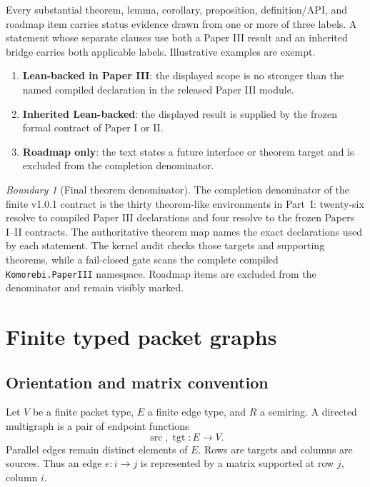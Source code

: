 \documentclass[11pt,a4paper]{article}
\theoremstyle{plain}
\theoremstyle{definition}
\theoremstyle{remark}
\newtheorem{boundary}[boundary]{Boundary}
\newcommand{\src}{\operatorname{src}}
\newcommand{\tgt}{\operatorname{tgt}}
\newcommand{\leanname}[1]{\nolinkurl{#1}}
\begin{document}
Every substantial theorem, lemma, corollary, proposition, definition/API, and
roadmap item carries status evidence drawn from one or more of three labels.
A statement
whose separate clauses use both a Paper III result and an inherited bridge
carries both applicable labels.  Illustrative examples are exempt.
\begin{enumerate}[label=\textbf{S\arabic*.},leftmargin=3.2em]
\item \textbf{Lean-backed in Paper III}: the displayed scope is no stronger
than the named compiled declaration in the released Paper III module.
\item \textbf{Inherited Lean-backed}: the displayed result is supplied by the
frozen formal contract of Paper I or II.
\item \textbf{Roadmap only}: the text states a future interface or theorem
target and is excluded from the completion denominator.
\end{enumerate}

\begin{boundary}[Final theorem denominator]
The completion denominator of the finite v1.0.1 contract is the thirty theorem-like environments in Part~I: twenty-six resolve to compiled Paper III declarations and four resolve
to the frozen Papers I--II contracts.  The authoritative theorem map names the
exact declarations used by each statement.  The kernel audit checks those
targets and supporting theorems, while a fail-closed gate scans the complete
compiled \leanname{Komorebi.PaperIII} namespace.  Roadmap items are excluded
from the denominator and remain visibly marked.
\end{boundary}

\section{Finite typed packet graphs}
\label{sec:edge-operators}

\subsection{Orientation and matrix convention}

Let $V$ be a finite packet type, $E$ a finite edge type, and $R$ a semiring.
A directed multigraph is a pair of endpoint functions
\[
  \src,\tgt:E\longrightarrow V.
\]
Parallel edges remain distinct elements of $E$.  Rows are targets and columns
are sources.  Thus an edge $e:i\to j$ is represented by a matrix supported at
row $j$, column $i$.
\end{document}
